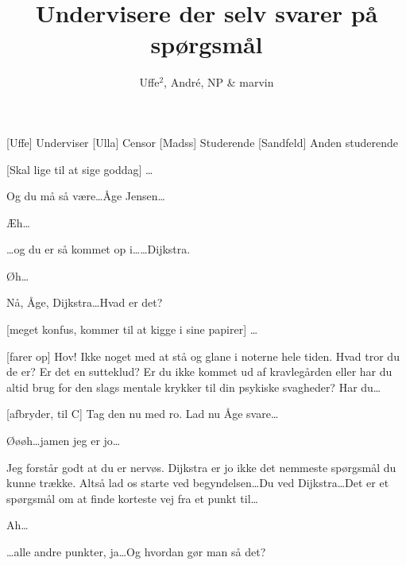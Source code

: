 \documentclass[a4paper,11pt]{article}
\title{Undervisere der selv svarer på spørgsmål}
\author{Uffe$^{2}$, André, NP \& marvin}
\begin{document}
\maketitle

\begin{roles}
[Uffe] Underviser
[Ulla] Censor
[Madss] Studerende
[Sandfeld] Anden studerende

\end{roles}

\begin{props}
\end{props}

  
\begin{sketch}


  [Skal lige til at sige goddag] \ldots

   Og du må så være\ldots Åge Jensen\ldots

   Æh\ldots {}

   \ldots og du er så kommet op i\ldots {}\ldots Dijkstra.

   Øh\ldots {}

   Nå, Åge, Dijkstra\ldots Hvad er det?

  [meget konfus, kommer til at kigge i sine papirer] \ldots

  [farer op] Hov! Ikke noget med at stå og glane i noterne hele tiden.
  Hvad tror du de er? Er det en sutteklud? Er du ikke kommet ud af kravlegården
  eller har du altid brug for den slags mentale krykker til din psykiske
  svagheder? Har du\ldots

  [afbryder, til C] Tag den nu med ro. Lad nu Åge svare\ldots

   Øøøh\ldots jamen jeg er jo\ldots

   Jeg forstår godt at du er nervøs. Dijkstra er jo ikke det nemmeste
  spørgsmål du kunne trække. Altså lad os starte ved begyndelsen\ldots Du ved
  Dijkstra\ldots Det er et spørgsmål om at finde korteste vej fra et punkt
  til\ldots

   Ah\ldots

   \ldots alle andre punkter, ja\ldots Og hvordan gør man så det?


\end{sketch}
\end{document}
